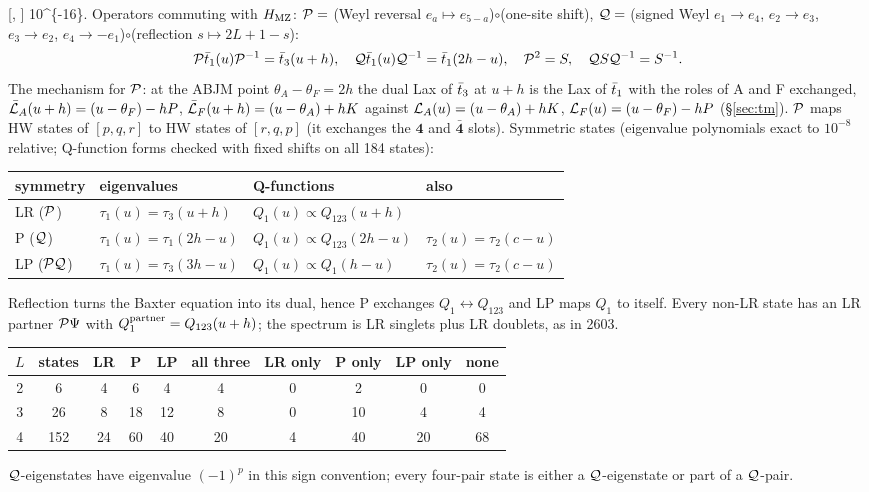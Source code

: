 [, ] \num{10^{-16}}. Operators commuting with $H_{\rm MZ}$:
$\mathcal P=$ (Weyl reversal $e_a\mapsto e_{5-a}$)$\circ$(one-site shift), $\mathcal Q=$ (signed Weyl $e_1\to e_4$, $e_2\to e_3$,
$e_3\to e_2$, $e_4\to-e_1$)$\circ$(reflection $s\mapsto2L+1-s$):
\begin{equation}
 \mathcal P\bar t_1(u)\mathcal P^{-1}=\bar t_3(u+h),\quad \mathcal Q\bar t_1(u)\mathcal Q^{-1}=\bar t_1(2h-u),\quad \mathcal P^2=S,\quad \mathcal Q S\mathcal Q^{-1}=S^{-1}.
\end{equation}
The mechanism for $\mathcal P$: at the ABJM point $\theta_A-\theta_F=2h$ the dual Lax of $\bar t_3$ at $u+h$ is the Lax of $\bar t_1$ with the roles of A and F
exchanged, $\bar{\mathcal L}_A(u+h)=(u-\theta_F)-hP$, $\bar{\mathcal L}_F(u+h)=(u-\theta_A)+hK$ against $\mathcal L_A(u)=(u-\theta_A)+hK$, $\mathcal L_F(u)=(u-\theta_F)-hP$ (\S\ref{sec:tm}).
$\mathcal P$ maps HW states of $[p,q,r]$ to HW states of $[r,q,p]$ (it exchanges the $\mathbf4$ and $\bar{\mathbf4}$ slots). Symmetric
states (eigenvalue polynomials exact to $10^{-8}$ relative; Q-function forms checked with fixed shifts on all 184 states):
\begin{center}
\begin{tabular}{llll}
\toprule
symmetry & eigenvalues & Q-functions & also\\
\midrule
LR ($\mathcal P$) & $\tau_1(u)=\tau_3(u+h)$ & $Q_1(u)\propto Q_{123}(u+h)$ & \\
P ($\mathcal Q$) & $\tau_1(u)=\tau_1(2h-u)$ & $Q_1(u)\propto Q_{123}(2h-u)$ & $\tau_2(u)=\tau_2(c-u)$\\
LP ($\mathcal P\mathcal Q$) & $\tau_1(u)=\tau_3(3h-u)$ & $Q_1(u)\propto Q_1(h-u)$ & $\tau_2(u)=\tau_2(c-u)$\\
\bottomrule
\end{tabular}
\end{center}
Reflection turns the Baxter equation into its dual, hence P exchanges $Q_1\leftrightarrow Q_{123}$ and LP maps $Q_1$ to
itself. Every non-LR state has an LR partner $\mathcal P\Psi$ with $Q_1^{\rm partner}=Q_{123}(u+h)$; the spectrum is LR singlets plus LR doublets, as in 2603.
\begin{center}
\begin{tabular}{cccccccccc}
\toprule
$L$ & states & LR & P & LP & all three & LR only & P only & LP only & none\\
\midrule
2 & 6 & 4 & 6 & 4 & 4 & 0 & 2 & 0 & 0\\
3 & 26 & 8 & 18 & 12 & 8 & 0 & 10 & 4 & 4\\
4 & 152 & 24 & 60 & 40 & 20 & 4 & 40 & 20 & 68\\
\bottomrule
\end{tabular}
\end{center}
$\mathcal Q$-eigenstates have eigenvalue $(-1)^p$ in this sign convention; every four-pair state is either a $\mathcal Q$-eigenstate or part of a $\mathcal Q$-pair.

